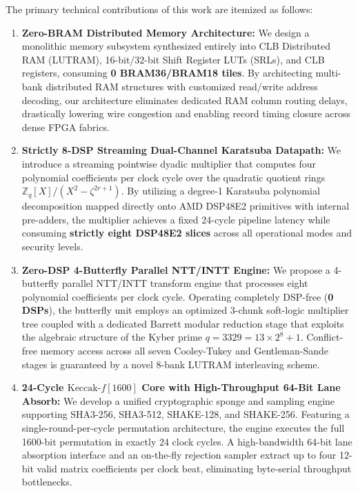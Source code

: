 The primary technical contributions of this work are itemized as follows:
\begin{enumerate}
    \item \textbf{Zero-BRAM Distributed Memory Architecture:}
    We design a monolithic memory subsystem synthesized entirely into CLB Distributed RAM (LUTRAM), 16-bit/32-bit Shift Register LUTs (SRLs), and CLB registers, consuming \textbf{0 BRAM36/BRAM18 tiles}. By architecting multi-bank distributed RAM structures with customized read/write address decoding, our architecture eliminates dedicated RAM column routing delays, drastically lowering wire congestion and enabling record timing closure across dense FPGA fabrics.

    \item \textbf{Strictly 8-DSP Streaming Dual-Channel Karatsuba Datapath:}
    We introduce a streaming pointwise dyadic multiplier that computes four polynomial coefficients per clock cycle over the quadratic quotient rings $\mathbb{Z}_q[X]/(X^2 - \zeta^{2r+1})$. By utilizing a degree-1 Karatsuba polynomial decomposition mapped directly onto AMD DSP48E2 primitives with internal pre-adders, the multiplier achieves a fixed 24-cycle pipeline latency while consuming \textbf{strictly eight DSP48E2 slices} across all operational modes and security levels.

    \item \textbf{Zero-DSP 4-Butterfly Parallel NTT/INTT Engine:}
    We propose a 4-butterfly parallel NTT/INTT transform engine that processes eight polynomial coefficients per clock cycle. Operating completely DSP-free (\textbf{0 DSPs}), the butterfly unit employs an optimized 3-chunk soft-logic multiplier tree coupled with a dedicated Barrett modular reduction stage that exploits the algebraic structure of the Kyber prime $q = 3329 = 13 \times 2^8 + 1$. Conflict-free memory access across all seven Cooley-Tukey and Gentleman-Sande stages is guaranteed by a novel 8-bank LUTRAM interleaving scheme.

    \item \textbf{24-Cycle $\text{Keccak-}f[1600]$ Core with High-Throughput 64-Bit Lane Absorb:}
    We develop a unified cryptographic sponge and sampling engine supporting SHA3-256, SHA3-512, SHAKE-128, and SHAKE-256. Featuring a single-round-per-cycle permutation architecture, the engine executes the full 1600-bit permutation in exactly 24 clock cycles. A high-bandwidth 64-bit lane absorption interface and an on-the-fly rejection sampler extract up to four 12-bit valid matrix coefficients per clock beat, eliminating byte-serial throughput bottlenecks.


\end{enumerate}
